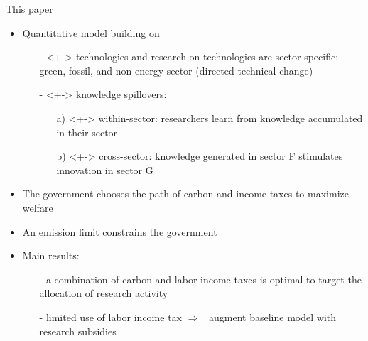\documentclass[11pt,aspectratio=169]{beamer}
\newcommand{\ar}{$\Rightarrow$ \ }
\begin{document}
\begin{frame}{This paper}
	\vspace{-2mm}
	\begin{itemize}
		\item<+-> Quantitative model building on \cite{Fried2018ClimateAnalysis} 
		\vspace{2mm}
		\begin{itemize}
			\item[-]<+-> \alert{technologies and research on technologies are sector specific}: green, fossil, and non-energy sector \footnotesize{(directed technical change) }
			\vspace{1mm}
			\item[-]<+-> \alert{knowledge spillovers}: 
			\begin{enumerate}
				\item[a)]<+-> \alert{within-sector}: researchers learn from knowledge accumulated in their sector
				\item[b)]<+-> \alert{cross-sector}: knowledge generated in sector F stimulates innovation in sector G
			\end{enumerate}%
		\end{itemize}
		\vspace{2mm}
		\item<+->   The government   chooses the \alert{path of carbon and income taxes} to maximize welfare\vspace{2mm}
		\item<+-> An \alert{emission limit} constrains the government		\vspace{2mm}
		\item<+-> \alert{Main results:} 
		\begin{itemize}
			\item[-] a combination of carbon and labor income taxes is optimal to target the allocation of research activity		\vspace{1mm} \item[-] limited use of labor income tax \ar augment baseline model with research subsidies
		\end{itemize}
	\end{itemize}


\end{frame}
\end{document}

